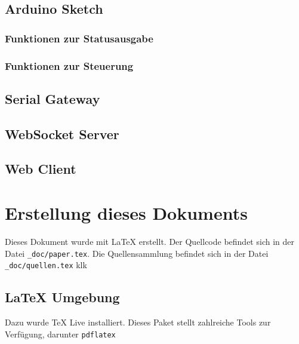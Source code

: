 \subsection{Arduino Sketch} \label{Arduino Sketch}

\subsubsection{Funktionen zur Statusausgabe}

\subsubsection{Funktionen zur Steuerung}


\newpage
\subsection{Serial Gateway} \label{Serial Gateway}


\newpage
\subsection{WebSocket Server} \label{WebSocket Server}


\newpage
\subsection{Web Client} \label{Web Client}


\newpage
\section{Erstellung dieses Dokuments}
Dieses Dokument wurde mit LaTeX erstellt. Der Quellcode befindet sich in der Datei
\verb|_doc/paper.tex|. Die Quellensammlung befindet sich in der Datei \verb|_doc/quellen.tex| klk

\subsection{LaTeX Umgebung}
Dazu wurde TeX Live \cite{texlive} installiert. Dieses
Paket stellt zahlreiche Tools zur Verfügung, darunter  \verb|pdflatex|

